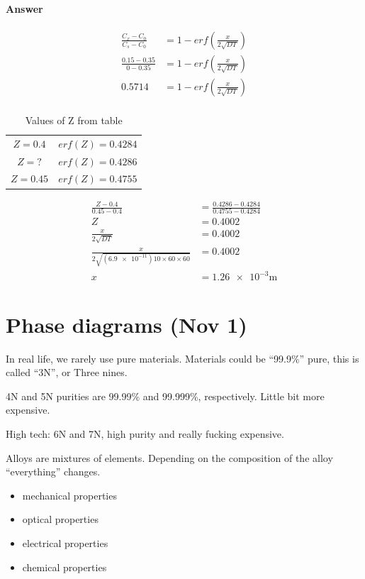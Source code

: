 \documentclass{article}
\begin{document}
\paragraph{Answer}
\begin{align*}
    \frac{C_x - C_0}{C_s - C_0} &= 1 - erf\left(\frac{x}{2\sqrt{DT}}\right)\\
    \frac{0.15-0.35}{0-0.35} &= 1-erf\left(\frac{x}{2\sqrt{DT}}\right)\\
    0.5714 &= 1-erf\left(\frac{x}{2\sqrt{DT}}\right)\\
\end{align*}

\begin{table}[h!]
    \centering
    \begin{tabular}{c c}
        $Z = 0.4$ & $erf(Z) = 0.4284$\\
        $Z = ?$ & $erf(Z) = 0.4286$\\
        $Z = 0.45$ & $erf(Z) = 0.4755$
    \end{tabular}
    \caption{Values of Z from table}
    \label{tab:Zvalues}
\end{table}

\begin{align*}
    \frac{Z-0.4}{0.45-0.4} &= \frac{0.4286 - 0.4284}{0.4755-0.4284}\\
    Z &= 0.4002\\
    \frac{x}{2\sqrt{DT}} &= 0.4002\\
    \frac{x}{2\sqrt{(\num{6.9e-11})10\times60\times60}} &= 0.4002\\
    x &= \num{1.26e-3}\si{\metre}
\end{align*}

\section{Phase diagrams (Nov 1)}

In real life, we rarely use pure materials. Materials could be ``99.9\%'' pure, this is called ``3N'', or Three nines.

4N and 5N purities are 99.99\% and 99.999\%, respectively. Little bit more expensive.

High tech: 6N and 7N, high purity and really fucking expensive.

Alloys are mixtures of elements. Depending on the composition of the alloy ``everything'' changes.
\begin{itemize}
    \item mechanical properties
    \item optical properties
    \item electrical properties
    \item chemical properties
\end{itemize}
\end{document}

